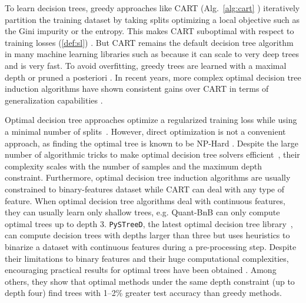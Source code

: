 To learn decision trees, greedy approaches like CART (Alg.~\ref{alg:cart} \cite{breiman1984classification}) iteratively partition the training dataset by taking splits optimizing a local objective such as the Gini impurity or the entropy. 
This makes CART suboptimal with respect to training losses (\ref{def:sl}) \cite{Murthy}. 
But CART remains the default decision tree algorithm in many machine learning libraries such as \cite{scikit-learn,xgb,ke2017lightgbm,9533597} because it can scale to very deep trees and is very fast.
To avoid overfitting, greedy trees are learned with a maximal depth or pruned a posteriori \cite[Chapter 3]{breiman1984classification}. 
In recent years, more complex optimal decision tree induction algorithms have shown consistent gains over CART in terms of generalization capabilities \cite{oct,verwer2017learning,murtree}.

Optimal decision tree approaches optimize a regularized training loss while using a minimal number of splits~\cite{oct,mfoct,binoct,quantbnb,murtree,blossom,pystreed,chaouki2024branchesfastdynamicprogramming}.
However, direct optimization is not a convenient approach, as finding the optimal tree is known to be NP-Hard \cite{npcomplete}. Despite the large number of algorithmic tricks to make optimal decision tree solvers efficient~\cite{murtree,quantbnb}, their complexity scales with the number of samples and the maximum depth constraint.
Furthermore, optimal decision tree induction algorithms are usually constrained to binary-features dataset while CART can deal with any type of feature. When optimal decision tree algorithms deal with continuous features, they can usually learn only shallow trees, e.g. Quant-BnB \cite{quantbnb} can only compute optimal trees up to depth 3.
\texttt{PySTreeD}, the latest optimal decision tree library~\cite{pystreed}, can compute decision trees with depths larger than three but uses heuristics to binarize a dataset with continuous features during a pre-processing step. %
Despite their limitations to binary features and their huge computational complexities, encouraging practical results for optimal trees have been obtained \cite{how-eff,lin2020generalized,costa2023recent,vanderlinden2024optimalgreedydecisiontrees}.
Among others, they show that optimal methods under the same depth constraint (up to depth four) find
trees with 1--2\% greater test accuracy than greedy methods.

